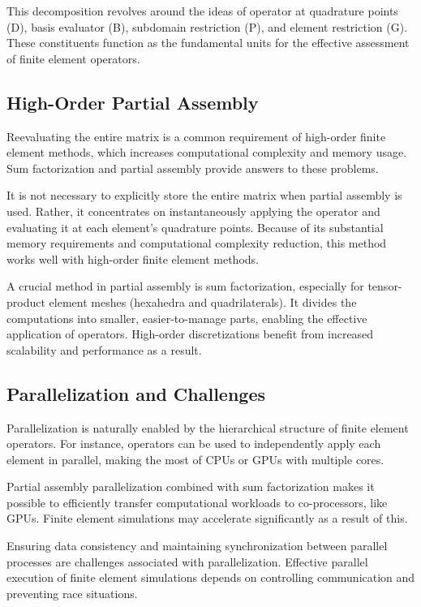 \documentclass{article}
\begin{document}
This decomposition revolves around the ideas of operator at quadrature points (D), basis evaluator (B), subdomain restriction (P), and element restriction (G). These constituents function as the fundamental units for the effective assessment of finite element operators.

\subsection{High-Order Partial Assembly}
Reevaluating the entire matrix is a common requirement of high-order finite element methods, which increases computational complexity and memory usage. Sum factorization and partial assembly provide answers to these problems.

It is not necessary to explicitly store the entire matrix when partial assembly is used. Rather, it concentrates on instantaneously applying the operator and evaluating it at each element's quadrature points. Because of its substantial memory requirements and computational complexity reduction, this method works well with high-order finite element methods.

A crucial method in partial assembly is sum factorization, especially for tensor-product element meshes (hexahedra and quadrilaterals). It divides the computations into smaller, easier-to-manage parts, enabling the effective application of operators. High-order discretizations benefit from increased scalability and performance as a result.

\subsection{Parallelization and Challenges}

Parallelization is naturally enabled by the hierarchical structure of finite element operators. For instance, operators can be used to independently apply each element in parallel, making the most of CPUs or GPUs with multiple cores.

Partial assembly parallelization combined with sum factorization makes it possible to efficiently transfer computational workloads to co-processors, like GPUs. Finite element simulations may accelerate significantly as a result of this.

Ensuring data consistency and maintaining synchronization between parallel processes are challenges associated with parallelization. Effective parallel execution of finite element simulations depends on controlling communication and preventing race situations.
\end{document}
